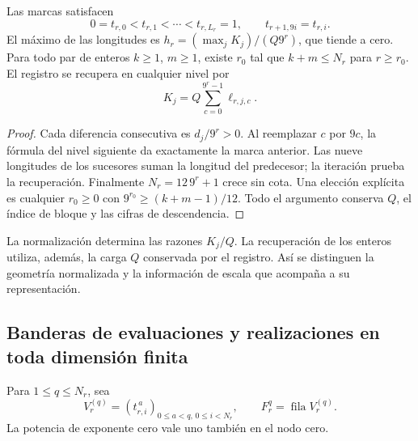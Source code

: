 \begin{proposition}
\label{prop:dim-grid}
Las marcas satisfacen
\[
 0=t_{r,0}<t_{r,1}<\cdots<t_{r,L_r}=1,
 \qquad t_{r+1,9i}=t_{r,i}.
\]
El máximo de las longitudes es
\(h_r=(\max_jK_j)/(Q9^r)\), que tiende a cero. Para todo par de
enteros \(k\geq1\), \(m\geq1\), existe \(r_0\) tal que
\(k+m\leq N_r\) para \(r\geq r_0\). El registro se recupera en
cualquier nivel por
\[
 K_j=Q\sum_{c=0}^{9^r-1}\ell_{r,j,c}.
\]
\end{proposition}
\begin{proof}
Cada diferencia consecutiva es \(d_j/9^r>0\). Al reemplazar \(c\)
por \(9c\), la fórmula del nivel siguiente da exactamente la marca
anterior. Las nueve longitudes de los sucesores suman la longitud del predecesor;
la iteración prueba la recuperación. Finalmente \(N_r=12\,9^r+1\)
crece sin cota. Una elección explícita es cualquier \(r_0\geq0\) con
\(9^{r_0}\geq(k+m-1)/12\). Todo el argumento conserva \(Q\), el
índice de bloque y las cifras de descendencia.
\end{proof}

La normalización determina las razones \(K_j/Q\). La recuperación de
los enteros utiliza, además, la carga \(Q\) conservada por el registro.
Así se distinguen la geometría normalizada y la información de escala
que acompaña a su representación.

\subsection{Banderas de evaluaciones y realizaciones en toda dimensión finita}

Para \(1\leq q\leq N_r\), sea
\[
 V_r^{(q)}=(t_{r,i}^{\,a})_{0\leq a<q,\,0\leq i<N_r},
 \qquad F_r^q=\operatorname{fila}V_r^{(q)}.
\]
La potencia de exponente cero vale uno también en el nodo cero.

